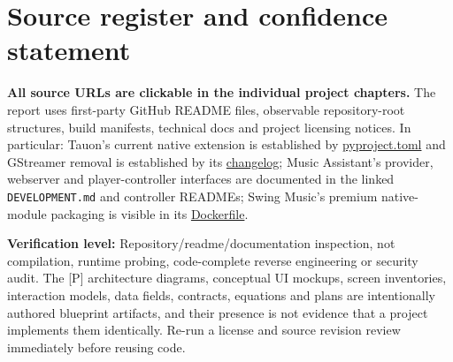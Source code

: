 \documentclass[10pt,a4paper,oneside]{report}
\begin{document}
\chapter*{Source register and confidence statement}
\textbf{All source URLs are clickable in the individual project chapters.} The report uses first-party GitHub README files, observable repository-root structures, build manifests, technical docs and project licensing notices. In particular: Tauon's current native extension is established by \href{https://github.com/Taiko2k/Tauon/blob/master/pyproject.toml}{pyproject.toml} and GStreamer removal is established by its \href{https://github.com/Taiko2k/Tauon/blob/master/CHANGELOG.md}{changelog}; Music Assistant's provider, webserver and player-controller interfaces are documented in the linked \texttt{DEVELOPMENT.md} and controller READMEs; Swing Music's premium native-module packaging is visible in its \href{https://github.com/swingmx/swingmusic/blob/master/Dockerfile}{Dockerfile}.

\textbf{Verification level:} Repository/readme/documentation inspection, not compilation, runtime probing, code-complete reverse engineering or security audit. The [P] architecture diagrams, conceptual UI mockups, screen inventories, interaction models, data fields, contracts, equations and plans are intentionally authored blueprint artifacts, and their presence is not evidence that a project implements them identically. Re-run a license and source revision review immediately before reusing code.
\end{document}
